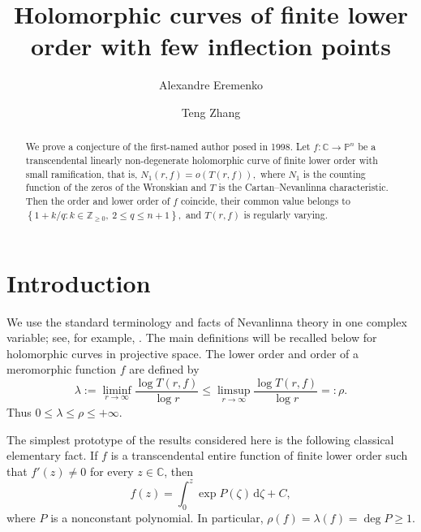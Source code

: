 \documentclass[12pt,letterpaper,reqno]{amsart}
\theoremstyle{definition}
\numberwithin{equation}{section}
\newcommand{\C}{\mathbb C}
\begin{document}
\title[Curves with few inflection points]{Holomorphic curves of finite lower order with few inflection points}
\author[A.~Eremenko]{Alexandre Eremenko}

\address{Mathematics Department, Purdue University,
	West Lafayette, IN 47907, USA}

\author[T.~Zhang]{Teng Zhang}
\address{School of Mathematics and Statistics, Xi'an Jiaotong University,
Xi'an 710049, P. R. China}
\date{}
\begin{abstract}
We prove a conjecture of the first-named author posed in 1998.
Let $f:\C\to\mathbb P^{n}$ be a transcendental linearly non-degenerate
holomorphic curve of finite lower order with small ramification,
that is,
$
N_1(r,f)=o(T(r,f)),
$
where $N_1$ is the counting function of the zeros of the Wronskian and
$T$ is the Cartan--Nevanlinna characteristic.
Then the order and lower order of $f$ coincide, their common value belongs to
$
\left\{1+k/q: k\in\mathbb Z_{\ge0},\ 2\le q\le n+1\right\},
$
and $T(r,f)$ is regularly varying.

\end{abstract}
\maketitle

\tableofcontents

\section{Introduction}\label{sec:intro}

We use the standard terminology and facts of Nevanlinna theory in
one complex variable; see, for example, \cite{Hay64}. The main definitions
will be recalled below for holomorphic curves in projective space.
The lower order and order of a meromorphic function $f$ are defined by
\[
 \lambda:=\liminf_{r\to\infty}\frac{\log T(r,f)}{\log r}
 \leq\limsup_{r\to\infty}\frac{\log T(r,f)}{\log r}=: \rho.
\]
Thus $0\leq\lambda\leq\rho\leq+\infty$.

The simplest prototype of the results considered here is the following
classical elementary fact. If $f$ is a transcendental entire function of
finite lower order such that $f'(z)\ne0$ for every $z\in\C$, then
\[
 f(z)=\int_0^z\exp P(\zeta)\,\mathrm d\zeta+C,
\]
where $P$ is a nonconstant polynomial. In particular,
$
 \rho(f)=\lambda(f)=\deg P\geq1.
$
\end{document}
